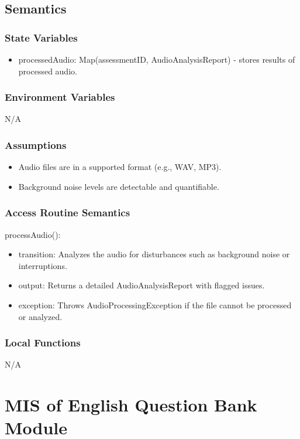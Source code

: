\documentclass[12pt, titlepage]{article}
\begin{document}
\subsection{Semantics}

\subsubsection{State Variables}
\begin{itemize}
\item processedAudio: Map(assessmentID, AudioAnalysisReport) - stores results of processed audio.
\end{itemize}

\subsubsection{Environment Variables}
N/A

\subsubsection{Assumptions}
\begin{itemize}
\item Audio files are in a supported format (e.g., WAV, MP3).
\item Background noise levels are detectable and quantifiable.
\end{itemize}

\subsubsection{Access Routine Semantics}

\noindent processAudio():
\begin{itemize}
\item transition: Analyzes the audio for disturbances such as background noise or interruptions.
\item output: Returns a detailed AudioAnalysisReport with flagged issues.
\item exception: Throws AudioProcessingException if the file cannot be processed or analyzed.
\end{itemize}

\subsubsection{Local Functions}
N/A
\section{MIS of English Question Bank Module} \label{EnglishQuestionBankModule}
\end{document}
